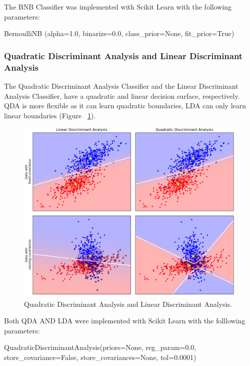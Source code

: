 The BNB Classifier was implemented with Scikit Learn with the following parameters:

\begin{tcolorbox}
\begin{center}
	BernoulliNB (alpha=1.0, binarize=0.0, class\_prior=None, fit\_prior=True)
\end{center}
\end{tcolorbox}

\subsubsection*{Quadratic Discriminant Analysis and Linear Discriminant Analysis}

The Quadratic Discriminant Analysis Classifier and the Linear Discriminant Analysis Classifier, have a quadratic and linear decision surface, respectively. QDA is more flexible as it can learn quadratic boundaries, LDA can only learn linear boundaries (Figure ~\ref{fig:qdalda}). 

\begin{figure}[h!]
\centering
\includegraphics[width=1\textwidth]{design_and_methodology/qda_and_lda.png}
\caption{\label{fig:qdalda} Quadratic Discriminant Analysis and Linear Discriminant Analysis.}
\end{figure}

Both QDA AND LDA were implemented with Scikit Learn with the folllowing parameters:

\begin{tcolorbox}
\begin{center}
	QuadraticDiscriminantAnalysis(priors=None, reg\_param=0.0, store\_covariance=False, store\_covariances=None, tol=0.0001)
\end{center}
\end{tcolorbox}

